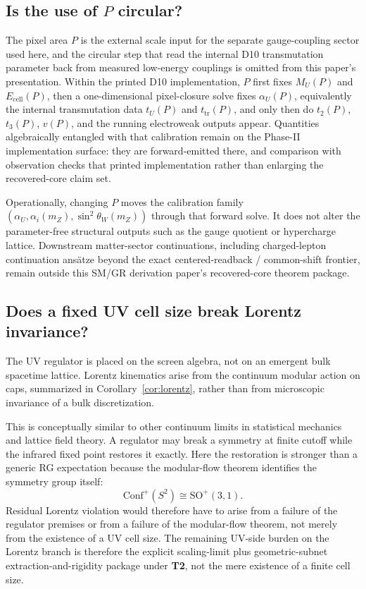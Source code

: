 \documentclass[11pt]{article}
\newcommand{\Conf}{\mathrm{Conf}}
\begin{document}
\subsection{\texorpdfstring{Is the use of $P$ circular?}{Is the use of P circular?}}

The pixel area \(P\) is the external scale input for the separate gauge-coupling sector used here, and the circular step that read the internal D10 transmutation parameter back from measured low-energy couplings is omitted from this paper's presentation. Within the printed D10 implementation, \(P\) first fixes \(M_U(P)\) and \(E_{\mathrm{cell}}(P)\), then a one-dimensional pixel-closure solve fixes \(\alpha_U(P)\), equivalently the internal transmutation data \(t_U(P)\) and \(t_{\mathrm{tr}}(P)\), and only then do \(t_2(P)\), \(t_3(P)\), \(v(P)\), and the running electroweak outputs appear. Quantities algebraically entangled with that calibration remain on the Phase-II implementation surface: they are forward-emitted there, and comparison with observation checks that printed implementation rather than enlarging the recovered-core claim set.

Operationally, changing \(P\) moves the calibration family \((\alpha_U,\alpha_i(m_Z),\sin^2\theta_W(m_Z))\) through that forward solve. It does not alter the parameter-free structural outputs such as the gauge quotient or hypercharge lattice. Downstream matter-sector continuations, including charged-lepton continuation ans\"atze beyond the exact centered-readback / common-shift frontier, remain outside this SM/GR derivation paper's recovered-core theorem package.

\subsection{Does a fixed UV cell size break Lorentz invariance?}

The UV regulator is placed on the screen algebra, not on an emergent bulk spacetime lattice. Lorentz kinematics arise from the continuum modular action on caps, summarized in Corollary~\ref{cor:lorentz}, rather than from microscopic invariance of a bulk discretization.

This is conceptually similar to other continuum limits in statistical mechanics and lattice field theory. A regulator may break a symmetry at finite cutoff while the infrared fixed point restores it exactly. Here the restoration is stronger than a generic RG expectation because the modular-flow theorem identifies the symmetry group itself:
\[
\Conf^+(S^2)\cong \mathrm{SO}^+(3,1).
\]
Residual Lorentz violation would therefore have to arise from a failure of the regulator premises or from a failure of the modular-flow theorem, not merely from the existence of a UV cell size.
The remaining UV-side burden on the Lorentz branch is therefore the explicit scaling-limit plus geometric-subnet extraction-and-rigidity package under \textbf{T2}, not the mere existence of a finite cell size.
\end{document}

